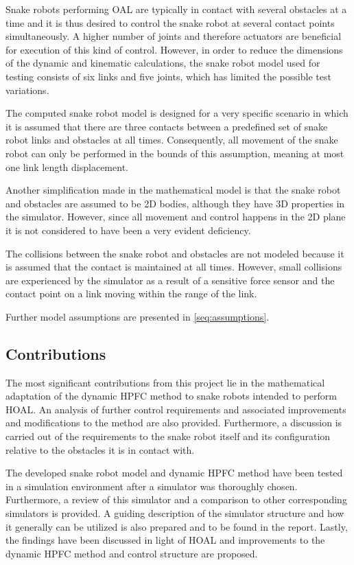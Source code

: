 Snake robots performing OAL are typically in contact with several obstacles at a time and it is thus desired to control the snake robot at several contact points simultaneously. A higher number of joints and therefore actuators are beneficial for execution of this kind of control. However, in order to reduce the dimensions of the dynamic and kinematic calculations, the snake robot model used for testing consists of six links and five joints, which has limited the possible test variations.

The computed snake robot model is designed for a very specific scenario in which it is assumed that there are three contacts between a predefined set of snake robot links and obstacles at all times. Consequently, all movement of the snake robot can only be performed in the bounds of this assumption, meaning at most one link length displacement.

Another simplification made in the mathematical model is that the snake robot and obstacles are assumed to be 2D bodies, although they have 3D properties in the simulator. However, since all movement and control happens in the 2D plane it is not considered to have been a very evident deficiency.

The collisions between the snake robot and obstacles are not modeled because it is assumed that the contact is maintained at all times. However, small collisions are experienced by the simulator as a result of a sensitive force sensor and the contact point on a link moving within the range of the link.

Further model assumptions are presented in \ref{seq:assumptions}.

\subsection{Contributions}

The most significant contributions from this project lie in the mathematical adaptation of the dynamic HPFC method to snake robots intended to perform HOAL. An analysis of further control requirements and associated improvements and modifications to the method are also provided. Furthermore, a discussion is carried out of the requirements to the snake robot itself and its configuration relative to the obstacles it is in contact with.

The developed snake robot model and dynamic HPFC method have been tested in a simulation environment after a simulator was thoroughly chosen. Furthermore, a review of this simulator and a comparison to other corresponding simulators is provided. A guiding description of the simulator structure and how it generally can be utilized is also prepared and to be found in the report. Lastly, the findings have been discussed in light of HOAL and improvements to the dynamic HPFC method and control structure are proposed.



